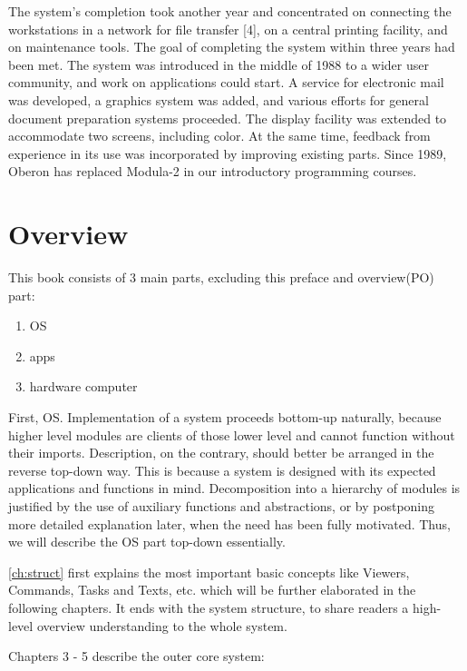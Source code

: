 The system's completion took another year and concentrated on connecting the workstations in a
network for file transfer [4], on a central printing facility, and on maintenance tools. The goal of
completing the system within three years had been met. The system was introduced in the middle
of 1988 to a wider user community, and work on applications could start. A service for electronic
mail was developed, a graphics system was added, and various efforts for general document
preparation systems proceeded. The display facility was extended to accommodate two screens,
including color. At the same time, feedback from experience in its use was incorporated by
improving existing parts. Since 1989, Oberon has replaced Modula-2 in our introductory programming courses.

\section{Overview}
This book consists of 3 main parts, excluding this preface and overview(PO) part:
\begin{enumerate}
	\item OS
	\item apps
	\item hardware computer
\end{enumerate}

First, OS. Implementation of a system proceeds bottom-up naturally, because higher level modules are
clients of those lower level and cannot function without their imports. Description, on the contrary,
should better be arranged in the reverse top-down way. This is because a system is designed with its
expected applications and functions in mind. Decomposition into a hierarchy of modules is justified by
the use of auxiliary functions and abstractions, or by postponing more detailed explanation later, when the need has been fully motivated. Thus, we will describe the OS part top-down essentially.

\ref{ch:struct} first explains the most important basic concepts like Viewers, Commands, Tasks and Texts, etc. which will be further elaborated in the following chapters. It ends with the system structure, to share readers a high-level overview understanding to the whole system.

Chapters 3 - 5 describe the outer core system:

